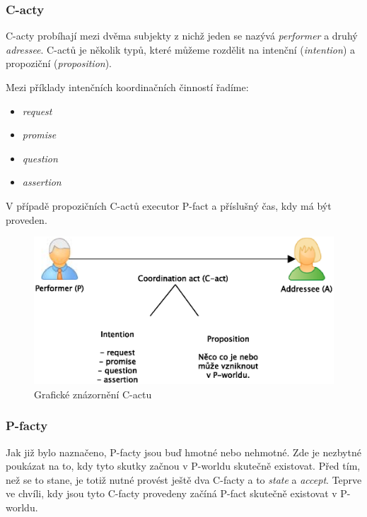 \subsubsection{C-acty}
C-acty probíhají mezi dvěma subjekty z nichž jeden se nazývá \textit{performer} a druhý \textit{adressee}. C-actů je několik typů, které můžeme rozdělit na intenční (\textit{intention}) a propoziční (\textit{proposition}).

Mezi příklady intenčních koordinačních činností řadíme:

\begin{itemize}
\item \textit{request}
\item \textit{promise}
\item \textit{question}
\item \textit{assertion}
\end{itemize}

V případě propozičních C-actů executor  P-fact a příslušný čas, kdy má být proveden.

\begin{center}
\begin{figure}[H]
\centerline{\includegraphics[scale=0.7]{obrazky/c-acts}}
\caption{Grafické znázornění C-actu \cite{Dietz2006}}
\label{fig:c-act}
\end{figure}
\end{center}

\subsubsection{P-facty}
Jak již bylo naznačeno, P-facty jsou buď hmotné nebo nehmotné. Zde je nezbytné poukázat na to, kdy tyto skutky začnou v P-worldu skutečně existovat. Před tím, než se to stane, je totiž nutné provést ještě dva C-facty a to \textit{state} a \textit{accept}. Teprve ve chvíli, kdy jsou tyto C-facty provedeny začíná P-fact skutečně existovat v P-worldu.

